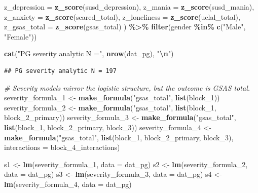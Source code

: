 \documentclass[
]{article}
\newenvironment{Shaded}{\begin{snugshade}}{\end{snugshade}}
\newcommand{\AttributeTok}[1]{\textcolor[rgb]{0.13,0.29,0.53}{#1}}
\newcommand{\CommentTok}[1]{\textcolor[rgb]{0.56,0.35,0.01}{\textit{#1}}}
\newcommand{\FunctionTok}[1]{\textcolor[rgb]{0.13,0.29,0.53}{\textbf{#1}}}
\newcommand{\NormalTok}[1]{#1}
\newcommand{\OtherTok}[1]{\textcolor[rgb]{0.56,0.35,0.01}{#1}}
\newcommand{\SpecialCharTok}[1]{\textcolor[rgb]{0.81,0.36,0.00}{\textbf{#1}}}
\newcommand{\StringTok}[1]{\textcolor[rgb]{0.31,0.60,0.02}{#1}}
\begin{document}
\begin{Shaded}
\begin{Highlighting}[]
    \AttributeTok{z\_depression =} \FunctionTok{z\_score}\NormalTok{(susd\_depression),}
    \AttributeTok{z\_mania      =} \FunctionTok{z\_score}\NormalTok{(susd\_mania),}
    \AttributeTok{z\_anxiety    =} \FunctionTok{z\_score}\NormalTok{(scared\_total),}
    \AttributeTok{z\_loneliness =} \FunctionTok{z\_score}\NormalTok{(uclal\_total),}
    \AttributeTok{z\_gsas\_total =} \FunctionTok{z\_score}\NormalTok{(gsas\_total)}
\NormalTok{  ) }\SpecialCharTok{\%\textgreater{}\%}
  \FunctionTok{filter}\NormalTok{(gender }\SpecialCharTok{\%in\%} \FunctionTok{c}\NormalTok{(}\StringTok{"Male"}\NormalTok{, }\StringTok{"Female"}\NormalTok{))}

\FunctionTok{cat}\NormalTok{(}\StringTok{"PG severity analytic N ="}\NormalTok{, }\FunctionTok{nrow}\NormalTok{(dat\_pg), }\StringTok{"}\SpecialCharTok{\textbackslash{}n}\StringTok{"}\NormalTok{)}
\end{Highlighting}
\end{Shaded}

\begin{verbatim}
## PG severity analytic N = 197
\end{verbatim}

\begin{Shaded}
\begin{Highlighting}[]
\CommentTok{\# Severity models mirror the logistic structure, but the outcome is GSAS total.}
\NormalTok{severity\_formula\_1 }\OtherTok{\textless{}{-}} \FunctionTok{make\_formula}\NormalTok{(}\StringTok{"gsas\_total"}\NormalTok{, }\FunctionTok{list}\NormalTok{(block\_1))}
\NormalTok{severity\_formula\_2 }\OtherTok{\textless{}{-}} \FunctionTok{make\_formula}\NormalTok{(}\StringTok{"gsas\_total"}\NormalTok{, }\FunctionTok{list}\NormalTok{(block\_1, block\_2\_primary))}
\NormalTok{severity\_formula\_3 }\OtherTok{\textless{}{-}} \FunctionTok{make\_formula}\NormalTok{(}\StringTok{"gsas\_total"}\NormalTok{, }\FunctionTok{list}\NormalTok{(block\_1, block\_2\_primary, block\_3))}
\NormalTok{severity\_formula\_4 }\OtherTok{\textless{}{-}} \FunctionTok{make\_formula}\NormalTok{(}\StringTok{"gsas\_total"}\NormalTok{, }\FunctionTok{list}\NormalTok{(block\_1, block\_2\_primary, block\_3), }\AttributeTok{interactions =}\NormalTok{ block\_4\_interactions)}

\NormalTok{s1 }\OtherTok{\textless{}{-}} \FunctionTok{lm}\NormalTok{(severity\_formula\_1, }\AttributeTok{data =}\NormalTok{ dat\_pg)}
\NormalTok{s2 }\OtherTok{\textless{}{-}} \FunctionTok{lm}\NormalTok{(severity\_formula\_2, }\AttributeTok{data =}\NormalTok{ dat\_pg)}
\NormalTok{s3 }\OtherTok{\textless{}{-}} \FunctionTok{lm}\NormalTok{(severity\_formula\_3, }\AttributeTok{data =}\NormalTok{ dat\_pg)}
\NormalTok{s4 }\OtherTok{\textless{}{-}} \FunctionTok{lm}\NormalTok{(severity\_formula\_4, }\AttributeTok{data =}\NormalTok{ dat\_pg)}
\end{Highlighting}
\end{Shaded}
\end{document}
